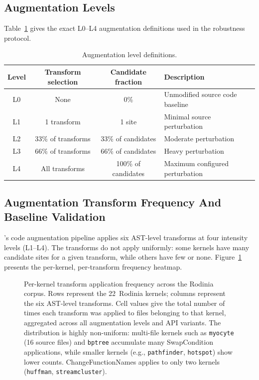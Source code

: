 \subsection{Augmentation Levels}
\label{sec:appendix-a-augmentation}

Table~\ref{tab:augmentation-levels} gives the exact L0--L4 augmentation
definitions used in the robustness protocol.

\begin{table}[htbp]
\centering
\caption{Augmentation level definitions.}
\label{tab:augmentation-levels}
\begin{tabular}{@{}cccp{4.2cm}@{}}
\toprule
Level & Transform selection & Candidate fraction & Description \\
\midrule
L0 & None & 0\% & Unmodified source code baseline \\
L1 & 1 transform & 1 site & Minimal source perturbation \\
L2 & 33\% of transforms & 33\% of candidates & Moderate perturbation \\
L3 & 66\% of transforms & 66\% of candidates & Heavy perturbation \\
L4 & All transforms & 100\% of candidates & Maximum configured perturbation \\
\bottomrule
\end{tabular}
\end{table}

\subsection{Augmentation Transform Frequency And Baseline Validation}
\label{sec:appendix-e1}

\parbench{}'s code augmentation pipeline applies six AST-level transforms at four
intensity levels (L1--L4). The transforms do not apply uniformly: some kernels
have many candidate sites for a given transform, while others have few or none.
Figure~\ref{fig:transform-freq} presents the per-kernel, per-transform frequency
heatmap.

\begin{figure}[htbp]
  \centering
  
  \caption{Per-kernel transform application frequency across the Rodinia corpus.
    Rows represent the 22~Rodinia kernels; columns represent the six AST-level
    transforms. Cell values give the total number of times each transform was
    applied to files belonging to that kernel, aggregated across all
    augmentation levels and API variants. The distribution is highly
    non-uniform: multi-file kernels such as \texttt{myocyte} (16 source files)
    and \texttt{bptree} accumulate many SwapCondition applications, while
    smaller kernels (e.g., \texttt{pathfinder}, \texttt{hotspot}) show lower
    counts. ChangeFunctionNames applies to only two kernels
    (\texttt{huffman}, \texttt{streamcluster}).}
  \label{fig:transform-freq}
\end{figure}

